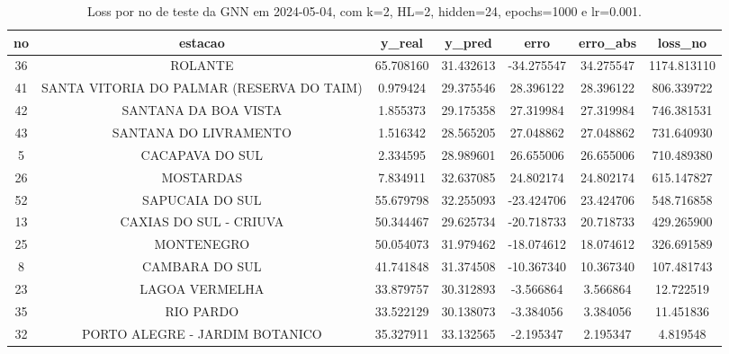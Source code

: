 \begin{table}[h]
\centering
\caption{Loss por no de teste da GNN em 2024-05-04, com k=2, HL=2, hidden=24, epochs=1000 e lr=0.001.}
\label{tab:gnn_loss_k2_hl2_h24_e1000_d20240504}
\begin{tabular}{ccccccc}
\toprule
no & estacao & y\_real & y\_pred & erro & erro\_abs & loss\_no \\
\midrule
36 & ROLANTE & 65.708160 & 31.432613 & -34.275547 & 34.275547 & 1174.813110 \\
41 & SANTA VITORIA DO PALMAR (RESERVA DO TAIM) & 0.979424 & 29.375546 & 28.396122 & 28.396122 & 806.339722 \\
42 & SANTANA DA BOA VISTA & 1.855373 & 29.175358 & 27.319984 & 27.319984 & 746.381531 \\
43 & SANTANA DO LIVRAMENTO & 1.516342 & 28.565205 & 27.048862 & 27.048862 & 731.640930 \\
5 & CACAPAVA DO SUL & 2.334595 & 28.989601 & 26.655006 & 26.655006 & 710.489380 \\
26 & MOSTARDAS & 7.834911 & 32.637085 & 24.802174 & 24.802174 & 615.147827 \\
52 & SAPUCAIA DO SUL & 55.679798 & 32.255093 & -23.424706 & 23.424706 & 548.716858 \\
13 & CAXIAS DO SUL - CRIUVA & 50.344467 & 29.625734 & -20.718733 & 20.718733 & 429.265900 \\
25 & MONTENEGRO & 50.054073 & 31.979462 & -18.074612 & 18.074612 & 326.691589 \\
8 & CAMBARA DO SUL & 41.741848 & 31.374508 & -10.367340 & 10.367340 & 107.481743 \\
23 & LAGOA VERMELHA & 33.879757 & 30.312893 & -3.566864 & 3.566864 & 12.722519 \\
35 & RIO PARDO & 33.522129 & 30.138073 & -3.384056 & 3.384056 & 11.451836 \\
32 & PORTO ALEGRE - JARDIM BOTANICO & 35.327911 & 33.132565 & -2.195347 & 2.195347 & 4.819548 \\
\bottomrule
\end{tabular}
\end{table}
